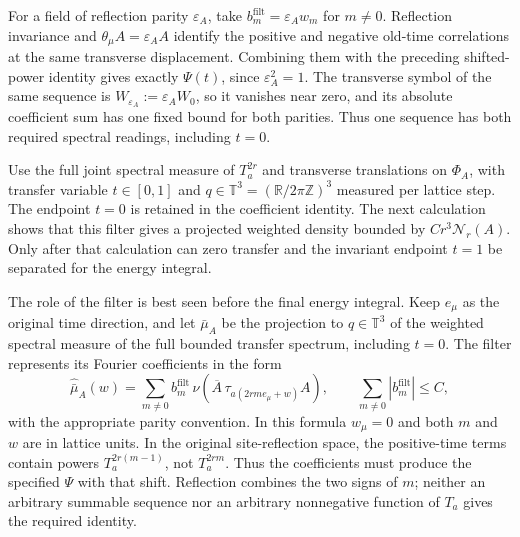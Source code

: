 \documentclass[11pt,letterpaper,reqno]{amsart}
\theoremstyle{definition}
\theoremstyle{remark}
\newcommand{\R}{\mathbb R}
\begin{document}
For a field of reflection parity $\varepsilon_A$, take
$b_m^{\mathrm{filt}}=\varepsilon_Aw_m$ for $m\ne0$.
Reflection invariance and $\theta_\mu A=\varepsilon_A A$ identify
the positive and negative old-time correlations at the same
transverse displacement. Combining them with the preceding
shifted-power identity gives exactly $\Psi(t)$, since
$\varepsilon_A^2=1$. The transverse symbol of the same sequence
is $W_{\varepsilon_A}:=\varepsilon_AW_0$, so it vanishes near zero, and its absolute
coefficient sum has one fixed bound for both parities. Thus one
sequence has both required spectral readings, including $t=0$.

Use the full joint spectral measure of $T_a^{2r}$ and transverse
translations on $\Phi_A$, with transfer variable $t\in[0,1]$ and
$q\in\mathbb T^3=(\R/2\pi\mathbb Z)^3$ measured per lattice step.
The endpoint $t=0$ is retained in the coefficient identity. The next
calculation shows that this filter gives a projected weighted density
bounded by $Cr^3\mathcal N_r(A)$. Only after that calculation can
zero transfer and the invariant endpoint $t=1$ be separated for the
energy integral.

The role of the filter is best seen before the final energy integral.
Keep $e_\mu$ as the original time direction, and let
$\bar\mu_A$ be the projection to $q\in\mathbb T^3$ of the weighted
spectral measure of the full bounded transfer spectrum, including
$t=0$. The filter represents its Fourier coefficients in the form
\begin{equation}\label{eq:expanded-filter-coefficients}
 \widehat{\bar\mu}_A(w)
 =\sum_{m\ne0}b_m^{\mathrm{filt}}\,
        \nu\!\left(\overline A\,
                    \tau_{a(2rm e_\mu+w)}A\right),
 \qquad \sum_{m\ne0}|b_m^{\mathrm{filt}}|\le C,
\end{equation}
with the appropriate parity convention. In this formula $w_\mu=0$
and both $m$ and $w$ are in lattice units. In the original
site-reflection space, the positive-time terms contain powers
$T_a^{2r(m-1)}$, not $T_a^{2rm}$. Thus the coefficients must produce
the specified $\Psi$ with that shift. Reflection combines the two
signs of $m$; neither an arbitrary summable sequence nor an arbitrary
nonnegative function of $T_a$ gives the required identity.
\end{document}
